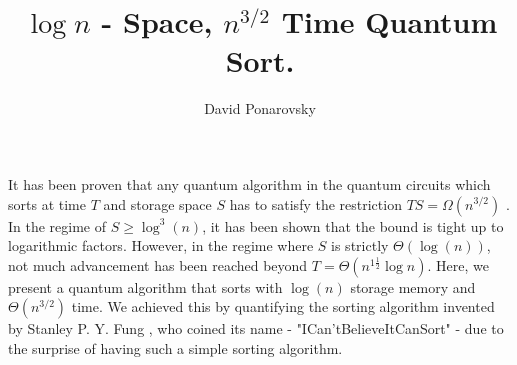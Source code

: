 \documentclass[manuscript,screen,review]{acmart}
\begin{document}


\title{$\log n$ - Space, $n^{3/2}$ Time Quantum Sort.} 
\author{David Ponarovsky}
\maketitle

It has been proven that any quantum algorithm in the quantum circuits which sorts at time $T$ and storage space $S$ has to satisfy the restriction $TS = \Omega(n^{3/2})$ \cite{klauck2003quantum}. In the regime of $S \ge \log^{3}(n)$, it has been shown that the bound is tight up to logarithmic factors. However, in the regime where $S$ is strictly $\Theta(\log(n))$, not much advancement has been reached beyond $T = \Theta( n^{1 \frac{1}{2}} \log n )$. Here, we present a quantum algorithm that sorts with $\log(n)$ storage memory and $ \Theta(n^{3/2})$ time. We achieved this by quantifying the sorting algorithm invented by Stanley P. Y. Fung \cite{Simplesort}, who coined its name - "ICan'tBelieveItCanSort" - due to the surprise of having such a simple sorting algorithm.
\end{document}
